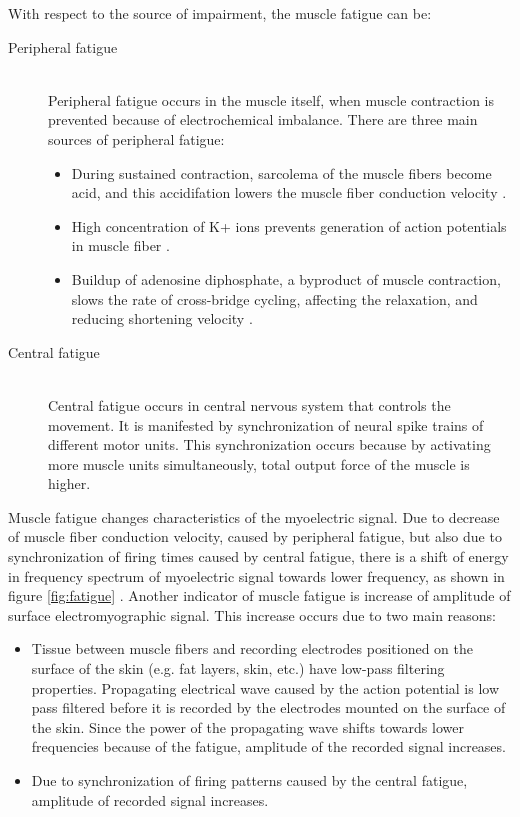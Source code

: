 With respect to the source of impairment, the muscle fatigue can be:

\begin{description}

\item[Peripheral fatigue] \hfill \\
	Peripheral fatigue occurs in the muscle itself, when muscle contraction is prevented because of electrochemical imbalance. There are three main sources of peripheral fatigue:
	\begin{itemize}
		\item During sustained contraction, sarcolema of the muscle fibers become acid, and this accidifation lowers the muscle fiber conduction velocity \citep{DeLuca1984}.
		
		\item High concentration of K+ ions prevents generation of action potentials in muscle fiber \citep{Widmaier2014}. 
		
		\item Buildup of adenosine diphosphate, a byproduct of muscle contraction, slows the rate of cross-bridge cycling, affecting the relaxation, and reducing shortening velocity \citep{Widmaier2014}.
	\end{itemize}

\item[Central fatigue] \hfill \\
	Central fatigue occurs in central nervous system that controls the movement. It is manifested by synchronization of neural spike trains of different motor units. This synchronization occurs because by activating more muscle units simultaneously, total output force of the muscle is higher. 

\end{description}

Muscle fatigue changes characteristics of the myoelectric signal. Due to decrease of muscle fiber conduction velocity, caused by peripheral fatigue, but also due to synchronization of firing times caused by central fatigue, there is a shift of energy in frequency spectrum of myoelectric signal towards lower frequency, as shown in figure \ref{fig:fatigue} \citep{DeLuca1984}. Another indicator of muscle fatigue is increase of amplitude of surface electromyographic signal. This increase occurs due to two main reasons:
\begin{itemize}
\item Tissue between muscle fibers and recording electrodes positioned on the surface of the skin (e.g. fat layers, skin, etc.) have low-pass filtering properties. Propagating electrical wave caused by the action potential is low pass filtered before it is recorded by the electrodes mounted on the surface of the skin. Since the power of the propagating wave shifts towards lower frequencies because of the fatigue, amplitude of the recorded signal increases.

\item Due to synchronization of firing patterns caused by the central fatigue, amplitude of recorded signal increases. 
\end{itemize} 

